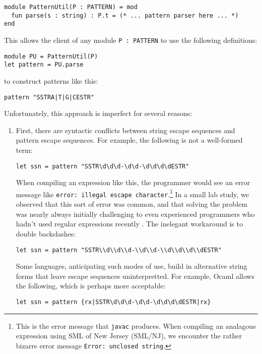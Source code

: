 \begin{lstlisting}[numbers=none]
module PatternUtil(P : PATTERN) = mod 
  fun parse(s : string) : P.t = (* ... pattern parser here ... *)
end 
\end{lstlisting}
This allows the client of any module \lstinline{P : PATTERN} to use the following definitions:
\begin{lstlisting}[numbers=none]
module PU = PatternUtil(P)
let pattern = PU.parse
\end{lstlisting}
to construct patterns like this:
\begin{lstlisting}[numbers=none]
pattern "SSTRA|T|G|CESTR"
\end{lstlisting}
Unfortunately, this approach is imperfect for several reasons:
\begin{enumerate} 
\item First, there are syntactic conflicts between string escape sequences and pattern escape sequences. For example, the following is not a well-formed term:
\begin{lstlisting}[numbers=none,mathescape=|]
let ssn = pattern "SSTR\d\d\d-\d\d-\d\d\d\dESTR"
\end{lstlisting}
When compiling an expression like this, the programmer would see an error message like \verb|error: illegal escape character|.\footnote{This is the error message that \texttt{javac} produces. When compiling an analagous expression using SML of New Jersey (SML/NJ), we encounter the rather bizarre error message \texttt{Error: unclosed string}.} In a small lab study, we observed that this sort of error was common, and that solving the problem was nearly always initially challenging to even experienced programmers who hadn't used regular expressions recently \cite{Omar:2012:ACC:2337223.2337324}. The inelegant workaround is to  double backslashes:
\begin{lstlisting}[numbers=none]
let ssn = pattern "SSTR\\d\\d\\d-\\d\\d-\\d\\d\\d\\dESTR"
\end{lstlisting}

Some languages, anticipating such modes of use, build in alternative string forms that leave escape sequences uninterpretted. For example, Ocaml allows the following, which is perhaps more acceptable:
\begin{lstlisting}[numbers=none]
let ssn = pattern {rx|SSTR\d\d\d-\d\d-\d\d\d\dESTR|rx}
\end{lstlisting}


\end{enumerate}

